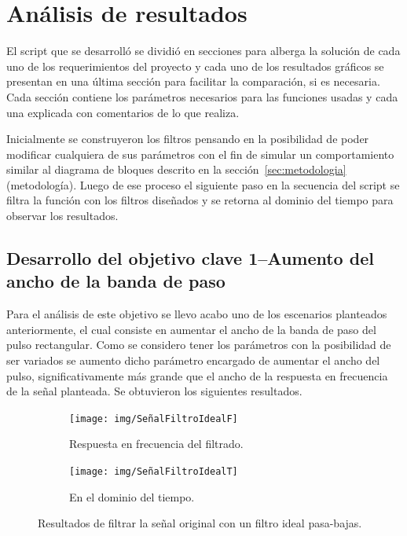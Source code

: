 \section{Análisis de resultados}\label{sec:resultados}
El script que se desarrolló se dividió en secciones para alberga la solución de cada uno de los requerimientos del proyecto y cada uno de los resultados gráficos se presentan en una última sección para facilitar la comparación, si es necesaria. Cada sección contiene los parámetros necesarios para las funciones usadas y cada una explicada con comentarios de lo que realiza.

Inicialmente se construyeron los filtros pensando en la posibilidad de poder modificar cualquiera de sus parámetros con el fin de simular un comportamiento similar al diagrama de bloques descrito en la sección~\ref{sec:metodologia} (metodología). Luego de ese proceso el siguiente paso en la secuencia del script se filtra la función con los filtros diseñados y se retorna al dominio del tiempo para observar los resultados.

\subsection{Desarrollo del objetivo clave 1--Aumento del ancho de la banda de paso}
Para el análisis de este objetivo se llevo acabo uno de los escenarios planteados anteriormente, el cual consiste en aumentar el ancho de la banda de paso del pulso rectangular. Como se considero tener los parámetros con la posibilidad de ser variados se aumento dicho parámetro encargado de aumentar el ancho del pulso, significativamente más grande que el ancho de la respuesta en frecuencia de la señal planteada. Se obtuvieron los siguientes resultados.

\begin{figure}[H]
	\centering
	\begin{subfigure}[b]{0.48\linewidth}
		\texttt{[image: img/SeñalFiltroIdealF]}
		\caption{\scriptsize Respuesta en frecuencia del filtrado.}
		\label{subfig:aumentoFrecuencia}
	\end{subfigure}
	\begin{subfigure}[b]{0.48\linewidth}
		\texttt{[image: img/SeñalFiltroIdealT]}
		\caption{\scriptsize En el dominio del tiempo.}
		\label{subfig:aumentoTiempo}
	\end{subfigure}
	\vspace{-3mm}
	\caption{\scriptsize Resultados de filtrar la señal original con un filtro ideal pasa-bajas.}
	\label{fig:aumento}
	\vspace{-5mm}
\end{figure}

